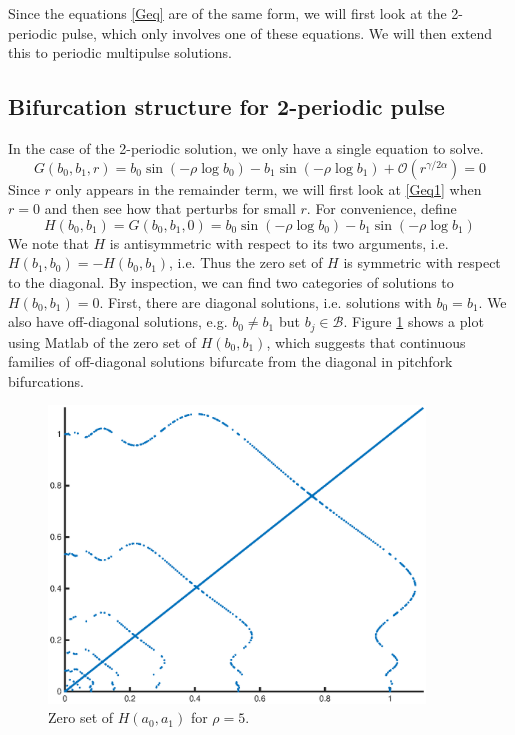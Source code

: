 \documentclass[thesis.tex]{subfiles}
\begin{document}
Since the equations \eqref{Geq} are of the same form, we will first look at the 2-periodic pulse, which only involves one of these equations. We will then extend this to periodic multipulse solutions.

\subsection{Bifurcation structure for 2-periodic pulse}

In the case of the 2-periodic solution, we only have a single equation to solve.
\begin{equation}\label{Geq1}
G(b_0, b_1, r) = b_0 \sin \left( -\rho \log b_0 \right) - b_1 \sin \left( -\rho \log b_1 \right) + \mathcal{O}(r^{\gamma / 2 \alpha}) = 0
\end{equation}
Since $r$ only appears in the remainder term, we will first look at \eqref{Geq1} when $r = 0$ and then see how that perturbs for small $r$. For convenience, define
\begin{equation}\label{defH}
H(b_0, b_1) = G(b_0, b_1, 0) = 
b_0 \sin \left( -\rho \log b_0 \right) - b_1 \sin \left( -\rho \log b_1 \right)
\end{equation}
We note that $H$ is antisymmetric with respect to its two arguments, i.e. $H(b_1, b_0) = -H(b_0, b_1)$, i.e.  Thus the zero set of $H$ is symmetric with respect to the diagonal. By inspection, we can find two categories of solutions to $H(b_0,b_1) = 0$. First, there are diagonal solutions, i.e. solutions with $b_0 = b_1$. We also have off-diagonal solutions, e.g. $b_0 \neq b_1$ but $b_j \in \mathcal{B}$. Figure \ref{fig:Fzeronumeric} shows a plot using Matlab of the zero set of $H(b_0, b_1)$, which suggests that continuous families of off-diagonal solutions bifurcate from the diagonal in pitchfork bifurcations.

\begin{figure}[H]
\label{fig:Fzeronumeric}
\includegraphics[width=10cm]{periodic/zeroset5}
\caption{Zero set of $H(a_0, a_1)$ for $\rho = 5$.}
\end{figure} 
\end{document}
